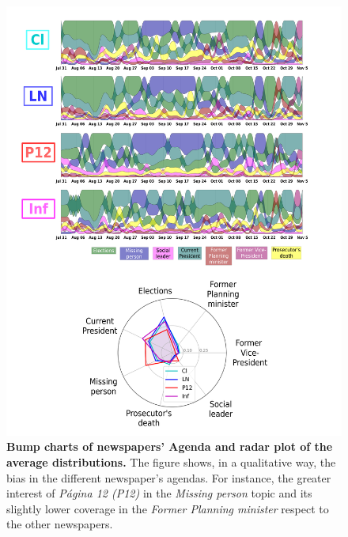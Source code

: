 \documentclass[a4paper, 12pt]{article}
\begin{document}
\begin{figure}[H]
\centering
\includegraphics[width = \textwidth]{images/Fig5.pdf}
\caption{\textbf{Bump charts of newspapers' Agenda and radar plot of the average distributions.} The figure shows, in a qualitative way, the bias in the different newspaper's agendas. For instance, the greater interest of \emph{P\'agina 12 (P12)} in the \emph{Missing person} topic and its slightly lower coverage in the \emph{Former Planning minister} respect to the other newspapers.}
\label{fig:news_agenda}
\end{figure}
\end{document}
